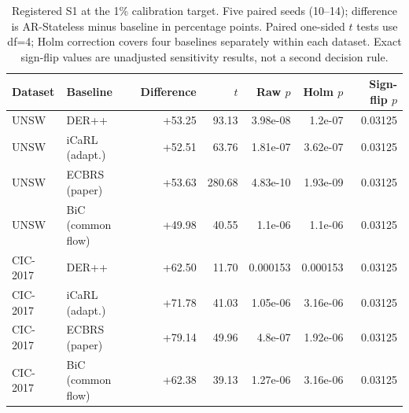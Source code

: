 \begin{table}[t]\centering\small
\caption{Registered S1 at the 1\% calibration target. Five paired seeds (10--14); difference is AR-Stateless minus baseline in percentage points. Paired one-sided $t$ tests use df=4; Holm correction covers four baselines separately within each dataset. Exact sign-flip values are unadjusted sensitivity results, not a second decision rule.}
\label{tab:section178-s1}
\begin{tabular}{llrrrrr}\toprule
Dataset & Baseline & Difference & $t$ & Raw $p$ & Holm $p$ & Sign-flip $p$\\\midrule
UNSW & DER++ & +53.25 & 93.13 & 3.98e-08 & 1.2e-07 & 0.03125\\
UNSW & iCaRL (adapt.) & +52.51 & 63.76 & 1.81e-07 & 3.62e-07 & 0.03125\\
UNSW & ECBRS (paper) & +53.63 & 280.68 & 4.83e-10 & 1.93e-09 & 0.03125\\
UNSW & BiC (common flow) & +49.98 & 40.55 & 1.1e-06 & 1.1e-06 & 0.03125\\
CIC-2017 & DER++ & +62.50 & 11.70 & 0.000153 & 0.000153 & 0.03125\\
CIC-2017 & iCaRL (adapt.) & +71.78 & 41.03 & 1.05e-06 & 3.16e-06 & 0.03125\\
CIC-2017 & ECBRS (paper) & +79.14 & 49.96 & 4.8e-07 & 1.92e-06 & 0.03125\\
CIC-2017 & BiC (common flow) & +62.38 & 39.13 & 1.27e-06 & 3.16e-06 & 0.03125\\
\bottomrule\end{tabular}\end{table}
